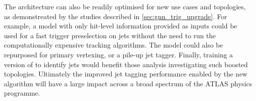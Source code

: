The \GNN architecture can also be readily optimised for new use cases and topologies, as demonstreated by the studies described in \cref{sec:gnn_trig_upgrade}.
For example, a model with only hit-level information provided as inputs could be used for a fast trigger preselection on jets without the need to run the computationally expensive tracking algorithms.
The model could also be repurposed for primary vertexing, or a pile-up jet tagger.
Finally, training a version of \GNN to identify \largeR jets would benefit those analysis investigating such boosted topologies.
Ultimately the improved jet tagging performance enabled by the new algorithm will have a large impact across a broad spectrum of the ATLAS physics programme.
